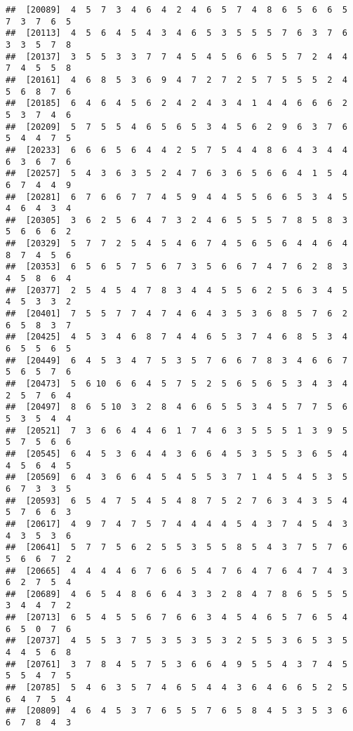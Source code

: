 \documentclass[
]{book}
\begin{document}
\begin{verbatim}
##  [20089]  4  5  7  3  4  6  4  2  4  6  5  7  4  8  6  5  6  6  5  7  3  7  6  5
##  [20113]  4  5  6  4  5  4  3  4  6  5  3  5  5  5  7  6  3  7  6  3  3  5  7  8
##  [20137]  3  5  5  3  3  7  7  4  5  4  5  6  6  5  5  7  2  4  4  7  4  5  5  8
##  [20161]  4  6  8  5  3  6  9  4  7  2  7  2  5  7  5  5  5  2  4  5  6  8  7  6
##  [20185]  6  4  6  4  5  6  2  4  2  4  3  4  1  4  4  6  6  6  2  5  3  7  4  6
##  [20209]  5  7  5  5  4  6  5  6  5  3  4  5  6  2  9  6  3  7  6  5  4  4  7  5
##  [20233]  6  6  6  5  6  4  4  2  5  7  5  4  4  8  6  4  3  4  4  6  3  6  7  6
##  [20257]  5  4  3  6  3  5  2  4  7  6  3  6  5  6  6  4  1  5  4  6  7  4  4  9
##  [20281]  6  7  6  6  7  7  4  5  9  4  4  5  5  6  6  5  3  4  5  4  6  4  3  4
##  [20305]  3  6  2  5  6  4  7  3  2  4  6  5  5  5  7  8  5  8  3  5  6  6  6  2
##  [20329]  5  7  7  2  5  4  5  4  6  7  4  5  6  5  6  4  4  6  4  8  7  4  5  6
##  [20353]  6  5  6  5  7  5  6  7  3  5  6  6  7  4  7  6  2  8  3  4  5  8  6  4
##  [20377]  2  5  4  5  4  7  8  3  4  4  5  5  6  2  5  6  3  4  5  4  5  3  3  2
##  [20401]  7  5  5  7  7  4  7  4  6  4  3  5  3  6  8  5  7  6  2  6  5  8  3  7
##  [20425]  4  5  3  4  6  8  7  4  4  6  5  3  7  4  6  8  5  3  4  6  5  5  6  5
##  [20449]  6  4  5  3  4  7  5  3  5  7  6  6  7  8  3  4  6  6  7  5  6  5  7  6
##  [20473]  5  6 10  6  6  4  5  7  5  2  5  6  5  6  5  3  4  3  4  2  5  7  6  4
##  [20497]  8  6  5 10  3  2  8  4  6  6  5  5  3  4  5  7  7  5  6  5  3  5  4  4
##  [20521]  7  3  6  6  4  4  6  1  7  4  6  3  5  5  5  1  3  9  5  5  7  5  6  6
##  [20545]  6  4  5  3  6  4  4  3  6  6  4  5  3  5  5  3  6  5  4  4  5  6  4  5
##  [20569]  6  4  3  6  6  4  5  4  5  5  3  7  1  4  5  4  5  3  5  6  7  3  3  5
##  [20593]  6  5  4  7  5  4  5  4  8  7  5  2  7  6  3  4  3  5  4  5  7  6  6  3
##  [20617]  4  9  7  4  7  5  7  4  4  4  4  5  4  3  7  4  5  4  3  4  3  5  3  6
##  [20641]  5  7  7  5  6  2  5  5  3  5  5  8  5  4  3  7  5  7  6  5  6  6  7  2
##  [20665]  4  4  4  4  6  7  6  6  5  4  7  6  4  7  6  4  7  4  3  6  2  7  5  4
##  [20689]  4  6  5  4  8  6  6  4  3  3  2  8  4  7  8  6  5  5  5  3  4  4  7  2
##  [20713]  6  5  4  5  5  6  7  6  6  3  4  5  4  6  5  7  6  5  4  6  5  0  7  6
##  [20737]  4  5  5  3  7  5  3  5  3  5  3  2  5  5  3  6  5  3  5  4  4  5  6  8
##  [20761]  3  7  8  4  5  7  5  3  6  6  4  9  5  5  4  3  7  4  5  5  5  4  7  5
##  [20785]  5  4  6  3  5  7  4  6  5  4  4  3  6  4  6  6  5  2  5  6  4  7  5  4
##  [20809]  4  6  4  5  3  7  6  5  5  7  6  5  8  4  5  3  5  3  6  6  7  8  4  3

\end{verbatim}
\end{document}
